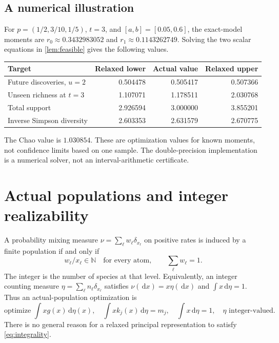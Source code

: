 \documentclass[11pt]{article}
\numberwithin{equation}{section}
\theoremstyle{definition}
\theoremstyle{remark}
\newcommand{\N}{\mathbb N}
\newcommand{\dd}{\,\mathrm d}
\begin{document}
\subsection{A numerical illustration}\label{subsec:example}
For $p=(1/2,3/10,1/5)$, $t=3$, and $[a,b]=[0.05,0.6]$, the exact-model moments are $r_0\approx0.3432983052$ and $r_1\approx0.1143262749$. Solving the two scalar equations in \cref{lem:feasible} gives the following values.
\begin{center}
\begin{tabular}{lrrr}
\toprule
Target & Relaxed lower & Actual value & Relaxed upper\\
\midrule
Future discoveries, $u=2$ &0.504478&0.505417&0.507366\\
Unseen richness at $t=3$ &1.107071&1.178511&2.030768\\
Total support &2.926594&3.000000&3.855201\\
Inverse Simpson diversity &2.603353&2.631579&2.670775\\
\bottomrule
\end{tabular}
\end{center}
The Chao value is $1.030854$. These are optimization values for known moments, not confidence limits based on one sample. The double-precision implementation is a numerical solver, not an interval-arithmetic certificate.

\section{Actual populations and integer realizability}\label{sec:realizability}
A probability mixing measure $\nu=\sum_\ell w_\ell\delta_{x_\ell}$ on positive rates is induced by a finite population if and only if
\begin{equation}\label{eq:integrality}
 w_\ell/x_\ell\in\N\quad\text{for every atom},\qquad \sum_\ell w_\ell=1.
\end{equation}
The integer is the number of species at that level. Equivalently, an integer counting measure $\eta=\sum_\ell n_\ell\delta_{x_\ell}$ satisfies $\nu(\dd x)=x\eta(\dd x)$ and $\int x\dd\eta=1$. Thus an actual-population optimization is
\[
 \text{optimize }\int xg(x)\dd\eta(x),\quad
 \int xk_j(x)\dd\eta=m_j,\quad \int x\dd\eta=1,
 \quad\eta\text{ integer-valued}.
\]
There is no general reason for a relaxed principal representation to satisfy \eqref{eq:integrality}.
\end{document}
